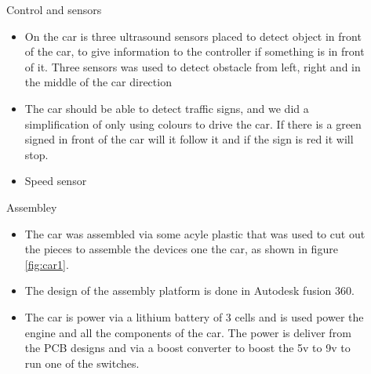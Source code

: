 \documentclass[final,hyperref={pdfpagelabels=false}]{beamer}
\begin{document}
\begin{frame}[t]
\begin{columns}[t]
\begin{column}{.465\textwidth}
\end{column} %

\begin{column}{.03\textwidth}\end{column} %
 
\begin{column}{.465\textwidth} %


\begin{block}{Control and sensors}

    \begin{itemize}
        \item On the car is three ultrasound sensors placed to detect object in front of the car, to give information to the controller if something is in front of it. Three sensors was used to detect obstacle from left, right and in the middle of the car direction
        
        \item The car should be able to detect traffic signs, and we did a simplification of only using colours to drive the car. If there is a green signed in front of the car will it follow it and if the sign is red it will stop.  
        
        \item Speed sensor
    \end{itemize}
    
    \end{block}



    \begin{block}{Assembley}

        \begin{itemize}
            \item The car was assembled via some acyle plastic that was used to cut out the pieces to assemble the devices one the car, as shown in figure \ref{fig:car1}.
            \item The design of the assembly platform is done in Autodesk fusion 360.
            
            
            \item The car is power via a lithium battery of 3 cells and is used power the engine and all the components of the car. The power is deliver from the PCB designs and via a boost converter to boost the 5v to 9v to run one of the switches.
              

\end{itemize}
\end{block}
\end{column}
\end{columns}
\end{frame}
\end{document}

